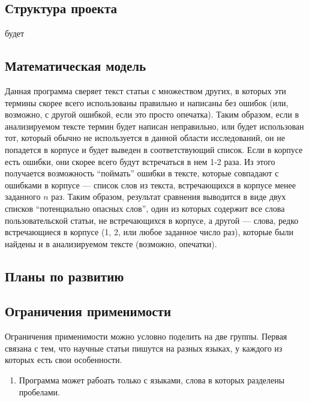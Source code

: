 \documentclass[a4paper,openbib]{report}
\begin{document}
\subsection*{Структура проекта}

будет

\subsection*{Математическая модель}

Данная программа сверяет текст статьи с множеством других, в которых эти термины скорее всего использованы правильно и написаны без ошибок 
(или, возможно, с другой ошибкой, если это просто опечатка). Таким образом, если в анализируемом тексте термин будет написан неправильно, 
или будет использован тот, который обычно не используется в данной области исследований, он не попадется в корпусе и будет выведен в соответствующий список. 
Если в корпусе есть ошибки, они скорее всего будут встречаться в нем 1-2 раза. Из этого получается возможность ``поймать'' ошибки в тексте, 
которые совпадают с ошибками в корпусе --- список слов из текста, встречающихся в корпусе менее заданного $n$ раз.
Таким образом, результат сравнения выводится в виде двух списков ``потенциально опасных слов'', один 
из которых содержит все слова пользовательской статьи, не встречающихся в корпусе, а другой --- слова, редко встречающиеся в 
корпусе (1, 2, или любое заданное число раз), которые были найдены и в анализируемом тексте (возможно, опечатки).

\subsection*{Планы по развитию}

\subsection*{Ограничения применимости}

Ограничения применимости можно условно поделить на две группы. Первая связана с тем, что научные статьи пишутся на разных языках, у каждого из которых есть свои 
особенности.
\begin{enumerate}
\item
 Программа может рабоать только с языками, слова в которых разделены пробелами.
\end{enumerate}
\end{document}
